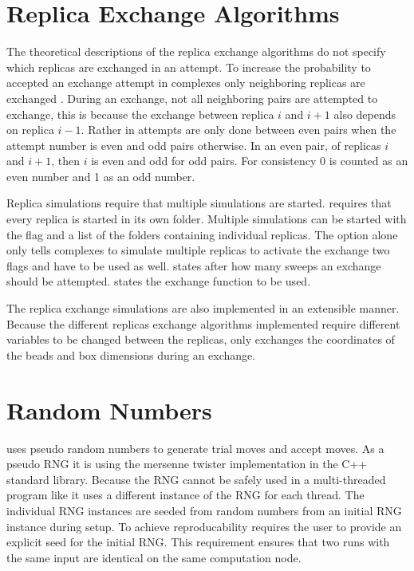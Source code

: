 \documentclass[12pt, twoside]{report}
\begin{document}
\section{Replica Exchange Algorithms}

The theoretical descriptions of the replica exchange algorithms do not specify
which replicas are exchanged in an attempt. To increase the probability to
accepted an exchange attempt in complexes only neighboring replicas are
exchanged \cite{Bussi2014}. During an exchange, not all neighboring pairs are
attempted to exchange, this is because the exchange between replica \(i\) and
\(i+1\) also depends on replica \(i-1\). Rather in \complexes attempts are only
done between even pairs when the attempt number is even and odd pairs otherwise.
In an even pair, of replicas \(i\) and \(i+1\), then \(i\) is even and odd for
odd pairs. For consistency 0 is counted as an even number and 1 as an odd
number.

Replica simulations require that multiple simulations are started. \complexes
requires that every replica is started in its own folder. Multiple simulations
can be started with the  flag and a list of the folders
containing individual replicas. The  option alone only
tells complexes to simulate multiple replicas to activate the exchange two flags
 and  have to be used as well.
 states after how many sweeps an exchange should be
attempted.  states the exchange function to be used.

The replica exchange simulations are also implemented in an extensible manner.
Because the different replicas exchange algorithms implemented require different
variables to be changed between the replicas, \complexes only exchanges the
coordinates of the beads and box dimensions during an exchange.


\section{Random Numbers}
\complexes uses pseudo random numbers to generate trial moves and accept moves.
As a pseudo \gls{RNG} it is using the mersenne twister \cite{Matsumoto1998}
implementation in the C++ standard library. Because the \gls{RNG} cannot be
safely used in a multi-threaded program like \complexes it uses a different
instance of the \gls{RNG} for each thread. The individual \gls{RNG} instances
are seeded from random numbers from an initial \gls{RNG} instance during setup.
To achieve reproducability \complexes requires the user to provide an explicit
seed for the initial \gls{RNG}. This requirement ensures that two runs with the
same input are identical on the same computation node.
\end{document}
